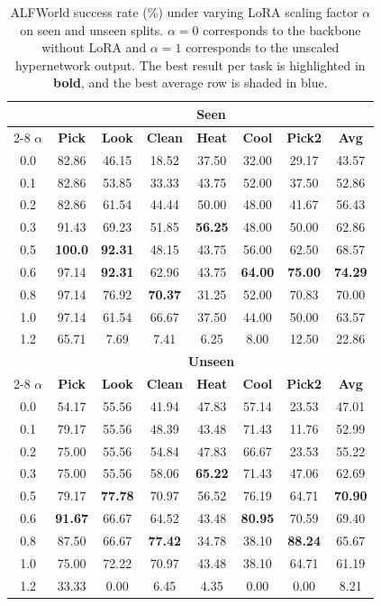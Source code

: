 \documentclass{llmxive}
\providecommand{\best}[1]{\textbf{#1}}
\providecommand{\arraystretch}{1.05}
\begin{document}
\begin{table}[!htbp]
\centering
\footnotesize
\setlength{\tabcolsep}{3.5pt}
\renewcommand{\arraystretch}{1.05}
\begin{tabular}{c ccccccc}
\toprule
& \multicolumn{7}{c}{\textbf{Seen}} \\
\cmidrule(lr){2-8}
$\alpha$
  & \textbf{Pick} & \textbf{Look} & \textbf{Clean}
  & \textbf{Heat} & \textbf{Cool} & \textbf{Pick2}
  & \textbf{Avg} \\
\midrule
0.0 & 82.86 & 46.15 & 18.52 & 37.50 & 32.00 & 29.17 & 43.57 \\
0.1 & 82.86 & 53.85 & 33.33 & 43.75 & 52.00 & 37.50 & 52.86 \\
0.2 & 82.86 & 61.54 & 44.44 & 50.00 & 48.00 & 41.67 & 56.43 \\
0.3 & 91.43 & 69.23 & 51.85 & \best{56.25} & 48.00 & 50.00 & 62.86 \\
0.5 & \best{100.0}& \best{92.31} & 48.15 & 43.75 & 56.00 & 62.50 & 68.57 \\
\rowcolor{ourblue}
0.6 & 97.14 & \best{92.31}& 62.96 & 43.75 & \best{64.00}& \best{75.00}& \best{74.29}\\
0.8 & 97.14 & 76.92 & \best{70.37}& 31.25 & 52.00 & 70.83 & 70.00 \\
1.0 & 97.14 & 61.54 & 66.67 & 37.50 & 44.00 & 50.00 & 63.57 \\
1.2 & 65.71 &  7.69 &  7.41 &  6.25 &  8.00 & 12.50 & 22.86 \\
\midrule
& \multicolumn{7}{c}{\textbf{Unseen}} \\
\cmidrule(lr){2-8}
$\alpha$
  & \textbf{Pick} & \textbf{Look} & \textbf{Clean}
  & \textbf{Heat} & \textbf{Cool} & \textbf{Pick2}
  & \textbf{Avg} \\
\midrule
0.0 & 54.17 & 55.56 & 41.94 & 47.83 & 57.14 & 23.53 & 47.01 \\
0.1 & 79.17 & 55.56 & 48.39 & 43.48 & 71.43 & 11.76 & 52.99 \\
0.2 & 75.00 & 55.56 & 54.84 & 47.83 & 66.67 & 23.53 & 55.22 \\
0.3 & 75.00 & 55.56 & 58.06 & \best{65.22}& 71.43 & 47.06 & 62.69 \\
\rowcolor{ourblue}
0.5 & 79.17& \best{77.78}& 70.97 & 56.52 & 76.19 & 64.71 & \best{70.90}\\
0.6 & \best{91.67}& 66.67 & 64.52 & 43.48 & \best{80.95}& 70.59 & 69.40 \\
0.8 & 87.50 & 66.67 & \best{77.42}& 34.78 & 38.10 & \best{88.24}& 65.67 \\
1.0 & 75.00 & 72.22 & 70.97 & 43.48 & 38.10 & 64.71 & 61.19 \\
1.2 & 33.33 &  0.00 &  6.45 &  4.35 &  0.00 &  0.00 &  8.21 \\
\bottomrule
\end{tabular}
\caption{
  ALFWorld success rate (\%) under varying LoRA scaling factor $\alpha$ on seen and unseen splits. $\alpha{=}0$ corresponds to the backbone without LoRA and $\alpha{=}1$ corresponds to the unscaled hypernetwork output. The best result per task is highlighted in \textbf{bold}, and the best average row is shaded in blue.
}
\label{tab:scale}
\end{table}
\end{document}
